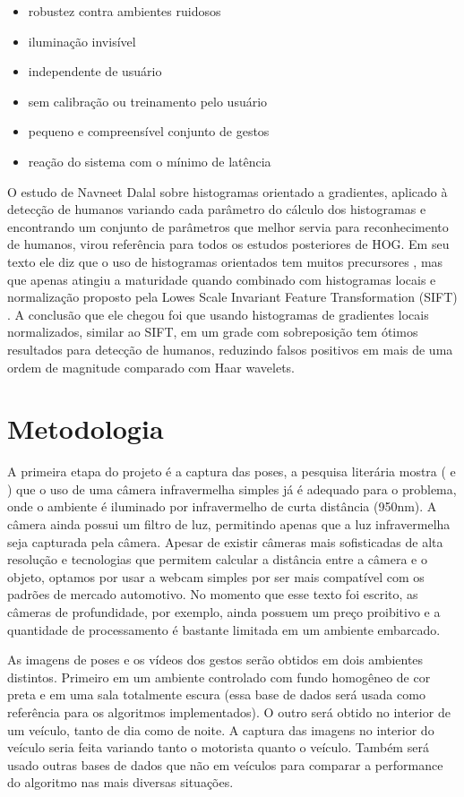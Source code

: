 \begin{itemize}
\item robustez contra ambientes ruidosos
\item iluminação invisível
\item independente de usuário
\item sem calibração ou treinamento pelo usuário
\item pequeno e compreensível conjunto de gestos
\item reação do sistema com o mínimo de latência
\end{itemize}

O estudo de Navneet Dalal \cite{dalal} sobre histogramas orientado a gradientes, aplicado à detecção de humanos variando cada parâmetro do cálculo dos histogramas e encontrando um conjunto de parâmetros que melhor servia para reconhecimento de humanos, virou referência para todos os estudos posteriores de HOG. Em seu texto ele diz que o uso de histogramas orientados tem muitos precursores \cite{ref3} \cite{ref4}, mas que apenas atingiu a maturidade quando combinado com histogramas locais e normalização proposto pela Lowes Scale Invariant Feature Transformation (SIFT) \cite{ref15}. A conclusão que ele chegou foi que usando histogramas de gradientes locais normalizados, similar ao SIFT, em um grade com sobreposição tem ótimos resultados para detecção de humanos, reduzindo falsos positivos em mais de uma ordem de magnitude comparado com Haar wavelets.

\section{Metodologia}

A primeira etapa do projeto é a captura das poses, a pesquisa literária mostra (\cite{ref1} e \cite{ref2}) que o uso de uma câmera infravermelha simples já é adequado para o problema, onde o ambiente é iluminado por infravermelho de curta distância (950nm). A câmera ainda possui um filtro de luz, permitindo apenas que a luz infravermelha seja capturada pela câmera. Apesar de existir câmeras mais sofisticadas de alta resolução e tecnologias que permitem calcular a distância entre a câmera e o objeto, optamos por usar a webcam simples por ser mais compatível com os padrões de mercado automotivo. No momento que esse texto foi escrito, as câmeras de profundidade, por exemplo, ainda possuem um preço proibitivo e a quantidade de processamento é bastante limitada em um ambiente embarcado.

As imagens de poses e os vídeos dos gestos serão obtidos em  dois ambientes distintos. Primeiro em um ambiente controlado com fundo homogêneo de cor preta e em uma sala totalmente escura (essa base de dados será usada como referência para os algoritmos implementados). O outro será obtido no interior de um veículo, tanto de dia como de noite. A captura das imagens no interior do veículo seria feita variando tanto o motorista quanto o veículo. Também será usado outras bases de dados que não em veículos para comparar a performance do algoritmo nas mais diversas situações.

